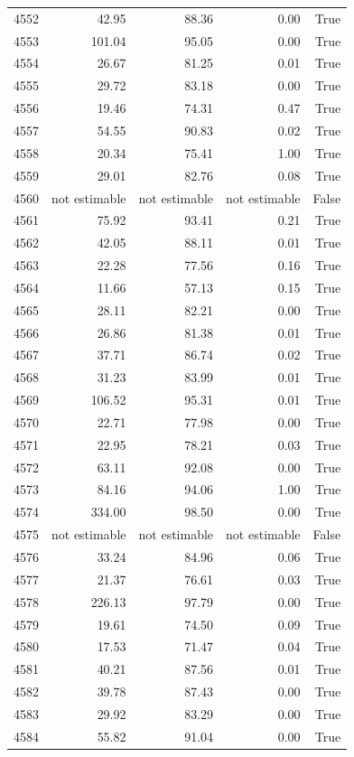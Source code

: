 \begin{longtable}{rrrrr}
4552 & 42.95 & 88.36 & 0.00 & True \\
4553 & 101.04 & 95.05 & 0.00 & True \\
4554 & 26.67 & 81.25 & 0.01 & True \\
4555 & 29.72 & 83.18 & 0.00 & True \\
4556 & 19.46 & 74.31 & 0.47 & True \\
4557 & 54.55 & 90.83 & 0.02 & True \\
4558 & 20.34 & 75.41 & 1.00 & True \\
4559 & 29.01 & 82.76 & 0.08 & True \\
4560 & not estimable & not estimable & not estimable & False \\
4561 & 75.92 & 93.41 & 0.21 & True \\
4562 & 42.05 & 88.11 & 0.01 & True \\
4563 & 22.28 & 77.56 & 0.16 & True \\
4564 & 11.66 & 57.13 & 0.15 & True \\
4565 & 28.11 & 82.21 & 0.00 & True \\
4566 & 26.86 & 81.38 & 0.01 & True \\
4567 & 37.71 & 86.74 & 0.02 & True \\
4568 & 31.23 & 83.99 & 0.01 & True \\
4569 & 106.52 & 95.31 & 0.01 & True \\
4570 & 22.71 & 77.98 & 0.00 & True \\
4571 & 22.95 & 78.21 & 0.03 & True \\
4572 & 63.11 & 92.08 & 0.00 & True \\
4573 & 84.16 & 94.06 & 1.00 & True \\
4574 & 334.00 & 98.50 & 0.00 & True \\
4575 & not estimable & not estimable & not estimable & False \\
4576 & 33.24 & 84.96 & 0.06 & True \\
4577 & 21.37 & 76.61 & 0.03 & True \\
4578 & 226.13 & 97.79 & 0.00 & True \\
4579 & 19.61 & 74.50 & 0.09 & True \\
4580 & 17.53 & 71.47 & 0.04 & True \\
4581 & 40.21 & 87.56 & 0.01 & True \\
4582 & 39.78 & 87.43 & 0.00 & True \\
4583 & 29.92 & 83.29 & 0.00 & True \\
4584 & 55.82 & 91.04 & 0.00 & True \\

\end{longtable}
